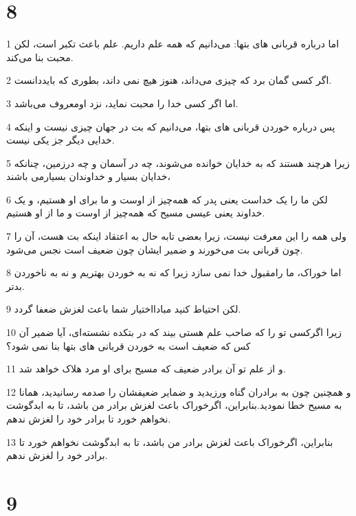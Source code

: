 \chapter{8}

\par 1 اما درباره قربانی های بتها: می‌دانیم که همه علم داریم. علم باعث تکبر است، لکن محبت بنا می‌کند.
\par 2 اگر کسی گمان برد که چیزی می‌داند، هنوز هیچ نمی داند، بطوری که بایددانست.
\par 3 اما اگر کسی خدا را محبت نماید، نزد اومعروف می‌باشد.
\par 4 پس درباره خوردن قربانی های بتها، می‌دانیم که بت در جهان چیزی نیست و اینکه خدایی دیگر جز یکی نیست.
\par 5 زیرا هرچند هستند که به خدایان خوانده می‌شوند، چه در آسمان و چه درزمین، چنانکه خدایان بسیار و خداوندان بسیارمی باشند،
\par 6 لکن ما را یک خداست یعنی پدر که همه‌چیز از اوست و ما برای او هستیم، و یک خداوند یعنی عیسی مسیح که همه‌چیز از اوست و ما از او هستیم.
\par 7 ولی همه را این معرفت نیست، زیرا بعضی تابه حال به اعتقاد اینکه بت هست، آن را چون قربانی بت می‌خورند و ضمیر ایشان چون ضعیف است نجس می‌شود.
\par 8 اما خوراک، ما رامقبول خدا نمی سازد زیرا که نه به خوردن بهتریم و نه به ناخوردن بدتر.
\par 9 لکن احتیاط کنید مبادااختیار شما باعث لغزش ضعفا گردد.
\par 10 زیرا اگرکسی تو را که صاحب علم هستی بیند که در بتکده نشسته‌ای، آیا ضمیر آن کس که ضعیف است به خوردن قربانی های بتها بنا نمی شود؟
\par 11 و از علم تو آن برادر ضعیف که مسیح برای او مرد هلاک خواهد شد.
\par 12 و همچنین چون به برادران گناه ورزیدید و ضمایر ضعیفشان را صدمه رسانیدید، همانا به مسیح خطا نمودید.بنابراین، اگرخوراک باعث لغزش برادر من باشد، تا به ابدگوشت نخواهم خورد تا برادر خود را لغزش ندهم.
\par 13 بنابراین، اگرخوراک باعث لغزش برادر من باشد، تا به ابدگوشت نخواهم خورد تا برادر خود را لغزش ندهم.

\chapter{9}


